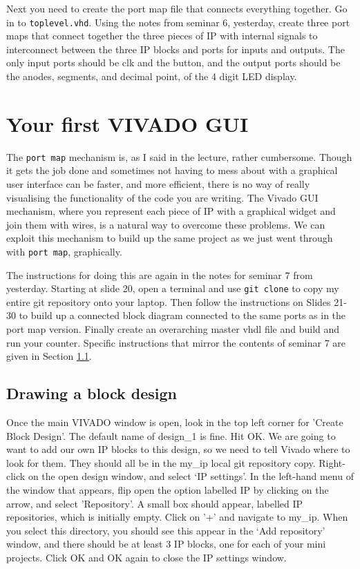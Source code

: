 \documentclass[../physical_computing.tex]{subfiles}
\begin{document}
Next you need to create the port map file that connects everything together. Go in to \texttt{toplevel.vhd}. Using the notes from seminar 6, yesterday, create three port maps that connect together the three pieces of IP with internal signals to interconnect between the three IP blocks and ports for inputs and outputs. The only input ports should be clk and the button, and the output ports should be the anodes, segments, and decimal point, of the 4 digit LED display.

\section{Your first VIVADO GUI}
\label{sec:firstvivadogui}

The \texttt{port map} mechanism is, as I said in the lecture, rather cumbersome. Though it gets the job done and sometimes not having to mess about with a graphical user interface can be faster, and more efficient, there is no way of really visualising the functionality of the code you are writing. The Vivado GUI mechanism, where you represent each piece of IP with a graphical widget and join them with wires, is a natural way to overcome these problems. We can exploit this mechanism to build up the same project as we just went through with \texttt{port map}, graphically.

The instructions for doing this are again in the notes for seminar 7 from yesterday. Starting at slide 20, open a terminal and use \texttt{git clone} to copy my entire git repository onto your laptop. Then follow the instructions on Slides 21-30 to build up a connected block diagram connected to the same ports as in the port map version. Finally create an overarching master vhdl file and build and run your counter. Specific instructions that mirror the contents of seminar 7 are given in Section \ref{sec:createblockdesign}.

\subsection{Drawing a block design}
\label{sec:createblockdesign}

Once the main VIVADO window is open, look in the top left corner for 'Create Block Design'. The default name of design\_1 is fine. Hit OK.
We are going to want to add our own IP blocks to this design, so we need to tell Vivado where to look for them. They should all be in the my\_ip local git repository copy. Right-click on the open design window, and select `IP settings'. In the left-hand menu of the window that appears, flip open the option labelled IP by clicking on the arrow, and select 'Repository'. A small box should appear, labelled IP repositories, which is initially empty. Click on '+' and navigate to my\_ip. When you select this directory, you should see this appear in the `Add repository' window, and there should be at least 3 IP blocks, one for each of your mini projects. Click OK and OK again to close the IP settings window.
\end{document}
